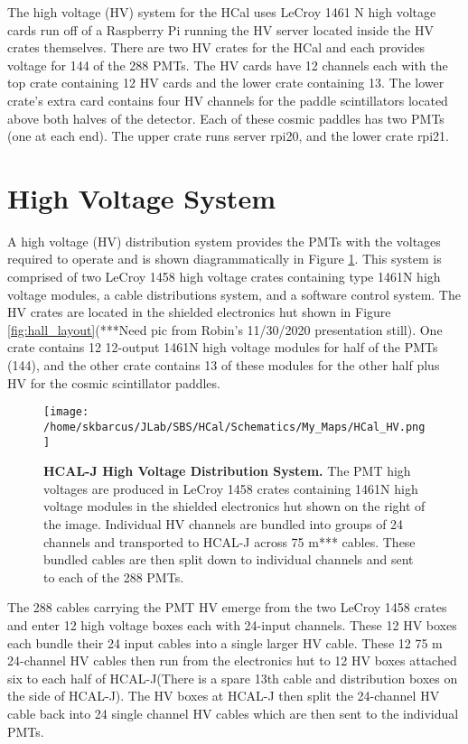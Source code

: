 \documentclass[oneside]{book}   %
\newcommand{\hcal}{HCAL-J\xspace}
\begin{document}
The high voltage (HV) system for the HCal uses LeCroy 1461 N high voltage cards run off of a Raspberry Pi running the HV server located inside the HV crates themselves. There are two HV crates for the HCal and each provides voltage for 144 of the 288 PMTs. The HV cards have 12 channels each with the top crate containing 12 HV cards and the lower crate containing 13. The lower crate's extra card contains four HV channels for the paddle scintillators located above both halves of the detector. Each of these cosmic paddles has two PMTs (one at each end). The upper crate runs server rpi20, and the lower crate rpi21. 

\section{High Voltage System}
\label{hv_layout}

A high voltage (HV) distribution system provides the PMTs with the voltages required to operate and is shown diagrammatically in Figure \ref{fig:hv}. This system is comprised of two LeCroy 1458 high voltage crates containing type 1461N high voltage modules, a cable distributions system, and a software control system. The HV crates are located in the shielded electronics hut shown in Figure \ref{fig:hall_layout}(***Need pic from Robin's 11/30/2020 presentation still). One crate contains 12 12-output 1461N high voltage modules for half of the PMTs (144), and the other crate contains 13 of these modules for the other half plus HV for the cosmic scintillator paddles. \\

 	\begin{figure}[!ht]
	\begin{center}
	\texttt{[image: /home/skbarcus/JLab/SBS/HCal/Schematics/My\_Maps/HCal\_HV.png]}
	\end{center}
	\caption{
	{\bf{\hcal High Voltage Distribution System.}} The PMT high voltages are produced in LeCroy 1458 crates containing 1461N high voltage modules in the shielded electronics hut shown on the right of the image. Individual HV channels are bundled into groups of 24 channels and transported to \hcal across 75 m*** cables. These bundled cables are then split down to individual channels and sent to each of the 288 PMTs.}
	\label{fig:hv}
	\end{figure}

The 288 cables carrying the PMT HV emerge from the two LeCroy 1458 crates and enter 12 high voltage boxes each with 24-input channels. These 12 HV boxes each bundle their 24 input cables into a single larger HV cable. These 12 75 m 24-channel HV cables then run from the electronics hut to 12 HV boxes attached six to each half of \hcal (There is a spare 13th cable and distribution boxes on the side of \hcal). The HV boxes at \hcal then split the 24-channel HV cable back into 24 single channel HV cables which are then sent to the individual PMTs.  
\end{document}
